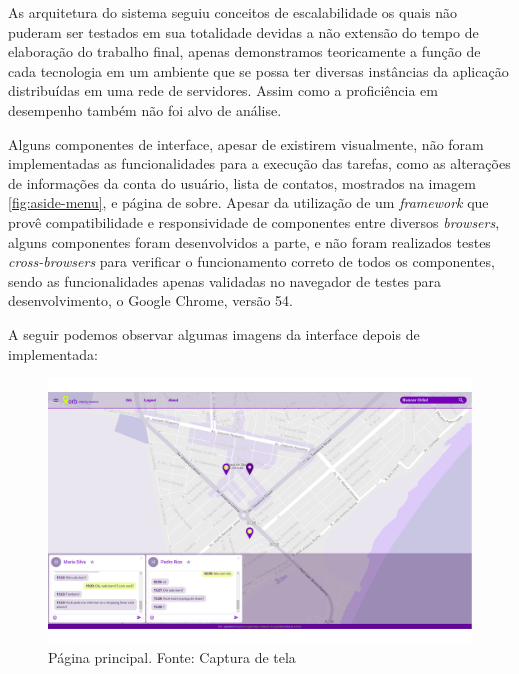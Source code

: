 As arquitetura do sistema seguiu conceitos de escalabilidade os quais não puderam ser testados em sua totalidade devidas a não extensão do tempo de elaboração do trabalho final, apenas demonstramos teoricamente a função de cada tecnologia em um ambiente que se possa ter diversas instâncias da aplicação distribuídas em uma rede de servidores. Assim como a proficiência em desempenho também não foi alvo de análise.

Alguns componentes de interface, apesar de existirem visualmente, não foram implementadas as funcionalidades para a execução das tarefas, como as alterações de informações da conta do usuário, lista de contatos, mostrados na imagem \ref{fig:aside-menu}, e página de sobre. Apesar da utilização de um \textit{framework} que provê compatibilidade e responsividade de componentes entre diversos \textit{browsers}, alguns componentes foram desenvolvidos a parte, e não foram realizados testes \textit{cross-browsers} para verificar o funcionamento correto de todos os componentes, sendo as funcionalidades apenas validadas no navegador de testes para desenvolvimento, o Google Chrome, versão 54.

A seguir podemos observar algumas imagens da interface depois de implementada:

\begin{figure}[H]
	\centering
	\includegraphics[scale=0.32]{imagens/pagina.png}
	\caption{\small Página principal. Fonte: Captura de tela}
	\label{fig:pagina}
\end{figure}

